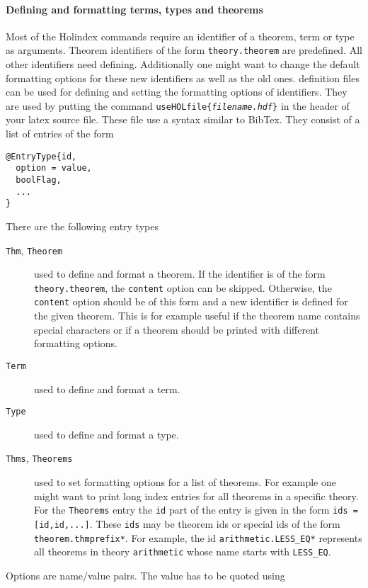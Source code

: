 

\paragraph{Defining and formatting terms, types and theorems}

  Most of the Holindex commands require an identifier of a theorem,
  term or type as arguments. Theorem identifiers of the form
  \texttt{theory.theorem} are predefined. All other identifiers need
  defining. Additionally one might want to change the default
  formatting options for these new identifiers as well as the old ones.
  \HOL{} definition files can be used for defining and
  setting the formatting options of identifiers. They are used by
  putting the command \texttt{\bs{}useHOLfile\{\textit{filename.hdf}\}} in
  the header of your latex source file. These file use a syntax similar to
  BibTex. They consist of a list of entries of the form
  \begin{verbatim}
@EntryType{id,
  option = value,
  boolFlag,
  ...
}
\end{verbatim}
\noindent
There are the following entry types
\begin{description}
\item[\texttt{Thm}, \texttt{Theorem}] used to define and format a
  theorem. If the identifier is of the form \texttt{theory.theorem},
  the \texttt{content} option can be skipped. Otherwise, the
  \texttt{content} option should be of this form and a new identifier
  is defined for the given theorem. This is for example useful if the
  theorem name contains special characters or if a theorem should
  be printed with different formatting options.
  \item[\texttt{Term}]
    used to define and format a term.
  \item[\texttt{Type}]
    used to define and format a type.
  \item[\texttt{Thms}, \texttt{Theorems}] used to set formatting options for
    a list of theorems. For example one might want to print long index entries
    for all theorems in a specific theory. For the \texttt{Theorems} entry
    the \texttt{id} part of the entry is given in the form
    \texttt{ids = [id,id,...]}. These \texttt{ids} may be theorem ids or special
    ids of the form \texttt{theorem.thmprefix*}.
    For example, the id
    \texttt{arithmetic.LESS\_EQ*} represents all theorems in
    theory \texttt{arithmetic} whose name starts with \texttt{LESS\_EQ}.
\end{description}
Options are name/value pairs. The value has to be quoted using
